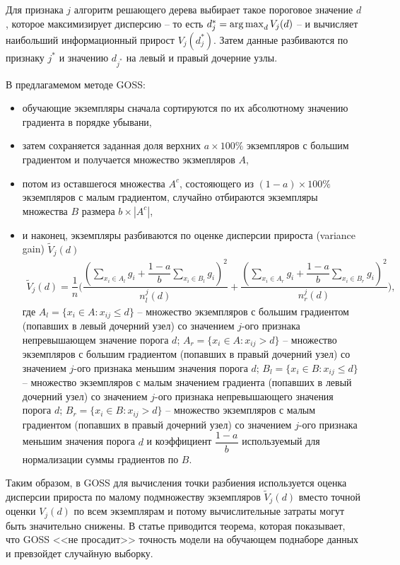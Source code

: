 \documentclass[%
	11pt,
	a4paper,
	utf8,
		]{article}
\begin{document}
Для признака $ j $ алгоритм решающего дерева выбирает такое пороговое значение $ d $, которое максимизирует дисперсию -- то есть $ d_j^* = \operatorname*{arg\,max}_d V_j(d) $ -- и вычисляет наибольший информационный прирост $ V_j(d_j^*) $. Затем данные разбиваются по признаку $ j^* $ и значению $ d_{j^*} $ на левый и правый дочерние узлы.

В предлагамемом методе GOSS:
\begin{itemize}
	\item обучающие экземпляры сначала сортируются по их абсолютному значению градиента в порядке убывани,
	
	\item затем сохраняется заданная доля верхних $ a \times 100\% $ экземпляров с большим градиентом и получается множество экзмепляров $ A $,
	
	\item потом из оставшегося множества $ A^c $, состояющего из $ (1 - a) \times 100\% $ экземпляров с малым градиентом, случайно отбираются экземпляры множества $ B $ размера $ b \times |A^c| $,
	
	\item и наконец, экземпляры разбиваются по оценке дисперсии прироста (variance gain) $ \tilde{V}_j(d) $
\begin{align*}
	\tilde{V}_j(d) = \dfrac{1}{n} \Bigg( \dfrac{(\sum_{ x_i \in A_l } g_i +\dfrac{ 1 - a}{b} \sum_{ x_i \in B_l } g_i)^2 }{ n_l^j(d) } + \dfrac{ ( \sum_{x_i \in A_r} g_i + \dfrac{1 - a}{b} \sum_{x_i \in B_r} g_i )^2 }{ n_r^j(d) } \Bigg),
\end{align*}
где $ A_l = \{ x_i \in A: x_{ij} \leqslant d \} $ -- множество экземпляров с большим градиентом (попавших в левый дочерний узел) со значением $ j $-ого признака непревышающем значение порога $ d $;  $ A_r = \{ x_i \in A: x_{ij} > d \} $ -- множество экземпляров с большим градиентом (попавших в правый дочерний узел) со значением $ j $-ого признака меньшим значения порога $ d $; $ B_l = \{ x_i \in B: x_{ij} \leqslant d \} $ -- множество экземпляров с малым значением градиента (попавших в левый дочерний узел) со значением $ j $-ого признака непревышающего значения порога $ d $; $ B_r = \{ x_i \in B: x_{ij} > d \} $ -- множество экземпляров с малым градиентом (попавших в правый дочерний узел) со значением $ j $-ого признака меньшим значения порога $ d $ и коэффициент $ \dfrac{1 - a}{b} $ используемый для нормализации суммы градиентов по $ B $.
\end{itemize}

Таким образом, в GOSS для вычисления точки разбиения используется оценка дисперсии прироста по малому подмножеству экземпляров $ \tilde{V}_j(d) $  вместо точной оценки $ V_j(d) $ по всем экземплярам и потому вычислительные затраты могут быть значительно снижены. В статье приводится теорема, которая показывает, что GOSS <<не просадит>> точность модели на обучающем поднаборе данных и превзойдет случайную выборку.
\end{document}
